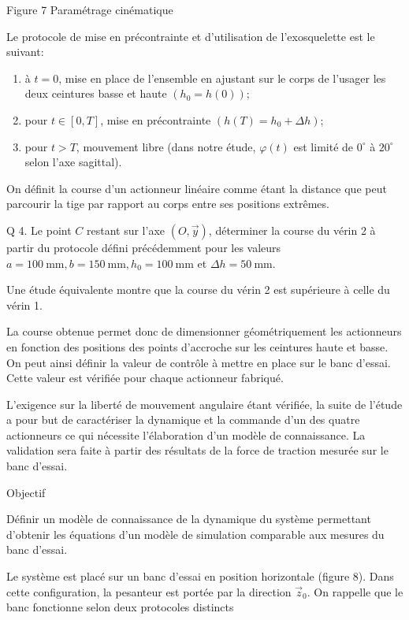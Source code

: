 \documentclass[10pt]{article}
\begin{document}
Figure 7 Paramétrage cinématique

Le protocole de mise en précontrainte et d'utilisation de l'exosquelette est le suivant:

\begin{enumerate}
  \item à $t=0$, mise en place de l'ensemble en ajustant sur le corps de l'usager les deux ceintures basse et haute $\left(h_{0}=h(0)\right)$;

  \item pour $t \in[0, T]$, mise en précontrainte $\left(h(T)=h_{0}+\Delta h\right)$;

  \item pour $t>T$, mouvement libre (dans notre étude, $\varphi(t)$ est limité de $0^{\circ}$ à $20^{\circ}$ selon l'axe sagittal).

\end{enumerate}

On définit la course d'un actionneur linéaire comme étant la distance que peut parcourir la tige par rapport au corps entre ses positions extrêmes.

Q 4. Le point $C$ restant sur l'axe $(O, \vec{y})$, déterminer la course du vérin 2 à partir du protocole défini précédemment pour les valeurs $a=100 \mathrm{~mm}, b=150 \mathrm{~mm}, h_{0}=100 \mathrm{~mm}$ et $\Delta h=50 \mathrm{~mm}$.

Une étude équivalente montre que la course du vérin 2 est supérieure à celle du vérin 1.

La course obtenue permet donc de dimensionner géométriquement les actionneurs en fonction des positions des points d'accroche sur les ceintures haute et basse. On peut ainsi définir la valeur de contrôle à mettre en place sur le banc d'essai. Cette valeur est vérifiée pour chaque actionneur fabriqué.

L'exigence sur la liberté de mouvement angulaire étant vérifiée, la suite de l'étude a pour but de caractériser la dynamique et la commande d'un des quatre actionneurs ce qui nécessite l'élaboration d'un modèle de connaissance. La validation sera faite à partir des résultats de la force de traction mesurée sur le banc d'essai.

Objectif

Définir un modèle de connaissance de la dynamique du système permettant d'obtenir les équations d'un modèle de simulation comparable aux mesures du banc d'essai.

Le système est placé sur un banc d'essai en position horizontale (figure 8). Dans cette configuration, la pesanteur est portée par la direction $\vec{z}_{0}$. On rappelle que le banc fonctionne selon deux protocoles distincts
\end{document}
